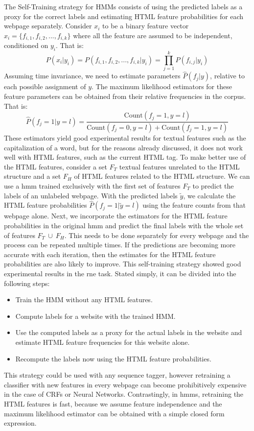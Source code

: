 \documentclass{nle}
\begin{document}
The Self-Training strategy for HMMs consists of using the predicted labels as a proxy for the
correct labels and estimating HTML feature probabilities for each webpage separately.
Consider $ x_i $ to be a binary feature vector $ x_i = \{ f_{i,1}, f_{i,2}, ..., f_{i,k} \} $
where all the feature are assumed to be independent, conditioned on $ y_i $. That is:
\begin{equation}
P(x_i|y_i) = P(f_{i,1}, f_{i,2}, ..., f_{i,k}|y_i) = \prod_{j=1}^k P(f_{i,j}|y_i)
\end{equation}
%
Assuming time invariance, we need to estimate parameters $ \hat{P}(f_{j}|y) $, 
relative to each possible assignment of $ y $.
The maximum likelihood estimators for these feature parameters can be obtained
from their relative frequencies in the corpus. That is:
%
\begin{equation}
\hat{P}(f_{j}=1|y=l) = \frac{\text{Count}(f_{j}=1, y=l)}
{\text{Count}(f_{j}=0, y=l) + \text{Count}(f_{j}=1, y=l)}
\label{eq:feature_mle}
\end{equation}
%
These estimators yield good experimental results for textual features such as the 
capitalization of a word, but for the reasons already discussed, it does not work
well with HTML features, such as the current HTML tag. To make better use of the
HTML features, consider a set $ F_T $ textual features unrelated to the HTML structure
and a set $ F_H $ of HTML features related to the HTML structure.
We can use a \gls{hmm} trained exclusively with the first set of features $ F_T $
to predict the labels of an unlabeled webpage. With the predicted labels $ \tilde{y} $, we calculate
the HTML feature probabilities $ \hat{P}(f_{j}=1|\tilde{y}=l) $ using the feature counts from
that webpage alone. Next, we incorporate the estimators for the HTML feature probabilities 
in the original \gls{hmm} and predict the final labels with the whole set of features 
{$ F_T~\cup~F_H $}. This needs to be done separately for every webpage and
the process can be repeated multiple times. If the predictions are becoming more accurate with
each iteration, then the estimates for the HTML feature probabilities are also likely to improve. 
This self-training strategy showed good experimental results in the \gls{rne} task. Stated
simply, it can be divided into the following steps:
%
\begin{itemize}
\item Train the HMM without any HTML features.
\item Compute labels for a website with the trained HMM.
\item Use the computed labels as a proxy for the actual labels in the 
website and estimate HTML feature frequencies for this website alone.
\item Recompute the labels now using the HTML feature probabilities.
\end{itemize}
%
This strategy could be used with any sequence tagger, however retraining a classifier 
with new features in every webpage can become prohibitively expensive in the case of 
CRFs or Neural Networks. Contrastingly, in \gls{hmm}s, retraining the HTML features is fast, 
because we assume feature independence and the maximum likelihood estimator can be obtained 
with a simple closed form expression.
\end{document}
